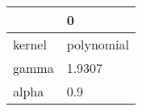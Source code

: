 \begin{tabular}{ll}
\toprule
{} &           0 \\
\midrule
kernel &  polynomial \\
gamma  &      1.9307 \\
alpha  &         0.9 \\
\bottomrule
\end{tabular}
